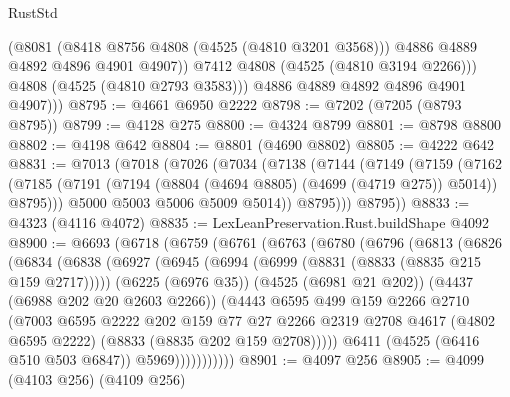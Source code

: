 \begin{lexlean}{RustStd}
\begin{coremodule}
                (@8081
                  (@8418 @8756 @4808 (@4525 (@4810 @3201 @3568)))
                  @4886
                  @4889
                  @4892
                  @4896
                  @4901
                  @4907))
              @7412
              @4808
              (@4525 (@4810 @3194 @2266)))
            @4808
            (@4525 (@4810 @2793 @3583)))
          @4886
          @4889
          @4892
          @4896
          @4901
          @4907)))
@8795 := @4661 @6950 @2222
@8798 := @7202 (@7205 (@8793 @8795))
@8799 := @4128 @275
@8800 := @4324 @8799
@8801 := @8798 @8800
@8802 := @4198 @642
@8804 := @8801 (@4690 @8802)
@8805 := @4222 @642
@8831 := @7013
    (@7018
      (@7026
        (@7034
          (@7138
            (@7144
              (@7149
                (@7159
                  (@7162
                    (@7185 (@7191 (@7194 (@8804 (@4694 @8805) (@4699 (@4719 @275)) @5014)) @8795)))
                  @5000
                  @5003
                  @5006
                  @5009
                  @5014))
              @8795)))
        @8795))
@8833 := @4323 (@4116 @4072)
@8835 := LexLeanPreservation.Rust.buildShape @4092
@8900 := @6693
    (@6718
      (@6759
        (@6761
          (@6763
            (@6780
              (@6796
                (@6813
                  (@6826
                    (@6834
                      (@6838
                        (@6927
                          (@6945
                            (@6994 (@6999 (@8831 (@8833 (@8835 @215 @159 @2717)))))
                            (@6225 (@6976 @35))
                            (@4525 (@6981 @21 @202))
                            (@4437 (@6988 @202 @20 @2603 @2266))
                            (@4443
                              @6595
                              @499
                              @159
                              @2266
                              @2710
                              (@7003
                                @6595
                                @2222
                                @202
                                @159
                                @77
                                @27
                                @2266
                                @2319
                                @2708
                                @4617
                                (@4802 @6595 @2222)
                                (@8833 (@8835 @202 @159 @2708)))))
                          @6411
                          (@4525 (@6416 @510 @503 @6847))
                          @5969)))))))))))
@8901 := @4097 @256
@8905 := @4099 (@4103 @256) (@4109 @256)

\end{coremodule}
\end{lexlean}
